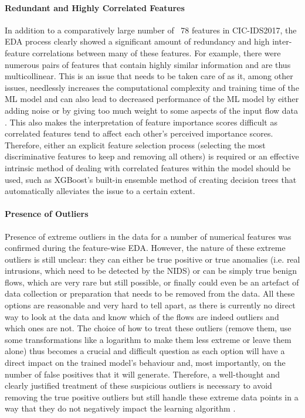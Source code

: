 \paragraph{Redundant and Highly Correlated Features} 
In addition to a comparatively large number of ~78 features in CIC-IDS2017, the EDA process clearly showed a significant amount of redundancy and high inter-feature correlations between many of these features. For example, there were numerous pairs of features that contain highly similar information and are thus multicollinear. This is an issue that needs to be taken care of as it, among other issues, needlessly increases the computational complexity and training time of the ML model and can also lead to decreased performance of the ML model by either adding noise or by giving too much weight to some aspects of the input flow data \parencite{kumar2021cicids}. This also makes the interpretation of feature importance scores difficult as correlated features tend to affect each other's perceived importance scores. Therefore, either an explicit feature selection process (selecting the most discriminative features to keep and removing all others) is required or an effective intrinsic method of dealing with correlated features within the model should be used, such as XGBoost's built-in ensemble method of creating decision trees that automatically alleviates the issue to a certain extent.

\paragraph{Presence of Outliers} 
Presence of extreme outliers in the data for a number of numerical features was confirmed during the feature-wise EDA. However, the nature of these extreme outliers is still unclear: they can either be true positive or true anomalies (i.e. real intrusions, which need to be detected by the NIDS) or can be simply true benign flows, which are very rare but still possible, or finally could even be an artefact of data collection or preparation that needs to be removed from the data. All these options are reasonable and very hard to tell apart, as there is currently no direct way to look at the data and know which of the flows are indeed outliers and which ones are not. The choice of how to treat these outliers (remove them, use some transformations like a logarithm to make them less extreme or leave them alone) thus becomes a crucial and difficult question as each option will have a direct impact on the trained model's behaviour and, most importantly, on the number of false positives that it will generate. Therefore, a well-thought and clearly justified treatment of these suspicious outliers is necessary to avoid removing the true positive outliers but still handle these extreme data points in a way that they do not negatively impact the learning algorithm \parencite{al2022cicids}.

